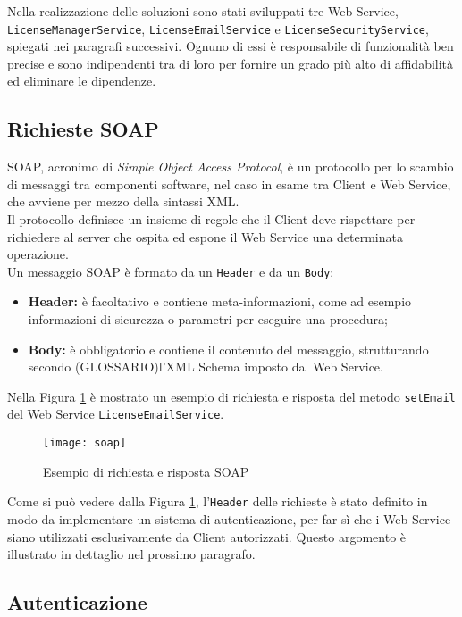 Nella realizzazione delle soluzioni sono stati sviluppati tre Web Service,\\ \texttt{LicenseManagerService}, \texttt{LicenseEmailService} e \texttt{LicenseSecurityService}, spiegati nei paragrafi successivi. Ognuno di essi è responsabile di funzionalità ben precise e sono indipendenti tra di loro per fornire un grado più alto di affidabilità ed eliminare le dipendenze.


\subsection{Richieste SOAP}
\label{soap}
SOAP, acronimo di \textit{Simple Object Access Protocol}, è un protocollo per lo scambio di messaggi tra componenti software, nel caso in esame tra Client e Web Service, che avviene per mezzo della sintassi XML. \\
Il protocollo definisce un insieme di regole che il Client deve rispettare per richiedere al server che ospita ed espone il Web Service una determinata operazione.
\\
Un messaggio SOAP è formato da un \texttt{Header} e da un \texttt{Body}:
\begin{itemize}
\item \textbf{Header:} è facoltativo e contiene meta-informazioni, come ad esempio informazioni di sicurezza o parametri per eseguire una procedura;
\item \textbf{Body:} è obbligatorio e contiene il contenuto del messaggio, strutturando secondo (GLOSSARIO)l'XML Schema imposto dal Web Service.
\end{itemize}

Nella Figura \ref{soap} è mostrato un esempio di richiesta e risposta del metodo \texttt{setEmail} del Web Service \texttt{LicenseEmailService}.

\begin{figure}[!h] 
    \centering 
    \texttt{[image: soap]} 
    \caption{Esempio di richiesta e risposta SOAP}
    \label{soap}
\end{figure}

Come si può vedere dalla Figura \ref{soap}, l'\texttt{Header} delle richieste è stato definito in modo da implementare un sistema
di autenticazione, per far sì che i Web Service siano utilizzati esclusivamente da Client autorizzati. Questo argomento è illustrato in dettaglio nel prossimo paragrafo.

\subsection{Autenticazione}

